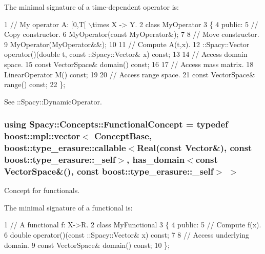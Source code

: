 \label{group__ConceptGroup_ga2c979d268f0ca7a436776a9631d10af7_DynamicOperatorConceptAnchor}%
\hypertarget{group__ConceptGroup_ga2c979d268f0ca7a436776a9631d10af7_DynamicOperatorConceptAnchor}{}%
The minimal signature of a time-\/dependent operator is\+: 
\begin{DoxyCode}
1 // My operator A: [0,T[ \(\backslash\)times X -> Y.
2 class MyOperator
3 \{
4 public:
5   // Copy constructor.
6   MyOperator(const MyOperator&);
7 
8   // Move constructor.
9   MyOperator(MyOperator&&);
10 
11   // Compute A(t,x).
12   ::Spacy::Vector operator()(double t, const ::Spacy::Vector& x) const;
13 
14   // Access domain space.
15   const VectorSpace& domain() const;
16 
17   // Access mass matrix.
18   LinearOperator M() const;
19 
20   // Access range space.
21   const VectorSpace& range() const;
22 \};
\end{DoxyCode}


See \+:\+:Spacy\+:\+:Dynamic\+Operator. \hypertarget{group__ConceptGroup_ga5273b50bd3e8c9a3f5a1e6b5f170836d_ga5273b50bd3e8c9a3f5a1e6b5f170836d}{}
\subsubsection[{Functional\+Concept}]{\setlength{\rightskip}{0pt plus 5cm}using {\bf Spacy\+::\+Concepts\+::\+Functional\+Concept} = typedef boost\+::mpl\+::vector$<$ {\bf Concept\+Base}, boost\+::type\+\_\+erasure\+::callable$<${\bf Real}(const {\bf Vector}\&), const boost\+::type\+\_\+erasure\+::\+\_\+self$>$, has\+\_\+domain$<$const {\bf Vector\+Space}\&(), const boost\+::type\+\_\+erasure\+::\+\_\+self$>$ $>$}\label{group__ConceptGroup_ga5273b50bd3e8c9a3f5a1e6b5f170836d_ga5273b50bd3e8c9a3f5a1e6b5f170836d}


Concept for functionals. 

\label{group__ConceptGroup_ga5273b50bd3e8c9a3f5a1e6b5f170836d_FunctionalConceptAnchor}%
\hypertarget{group__ConceptGroup_ga5273b50bd3e8c9a3f5a1e6b5f170836d_FunctionalConceptAnchor}{}%
The minimal signature of a functional is\+: 
\begin{DoxyCode}
1 // A functional f: X->R.
2 class MyFunctional
3 \{
4 public:
5   // Compute f(x).
6   double operator()(const ::Spacy::Vector& x) const;
7 
8   // Access underlying domain.
9   const VectorSpace& domain() const;
10 \};
\end{DoxyCode}


